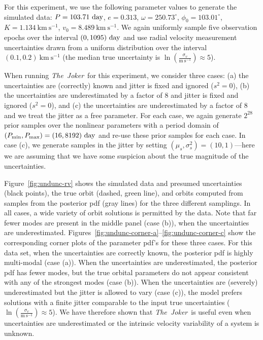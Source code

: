 \documentclass[manuscript, letterpaper]{aastex6}
\newcommand{\project}[1]{\textsl{#1}}
\newcommand{\samplername}{\project{The~Joker}}
\newcommand{\figname}{Figure}
\newcommand{\kms}{\mathrm{km}~\mathrm{s}^{-1}}
\newcommand{\mps}{\mathrm{m}~\mathrm{s}^{-1}}
\begin{document}
For this experiment, we use the following parameter values to generate the
simulated data: $P = 103.71~{\rm day}$, $e = 0.313$, $\omega = 250.73^\circ$,
$\phi_0 = 103.01^\circ$, $K = 1.134~\kms$, $v_0 = 8.489~\kms$.
We again uniformly sample five observation epochs over the interval $(0,1095)~{\rm
day}$ and use radial velocity measurement uncertainties drawn from a uniform
distribution over the interval $(0.1, 0.2)~\kms$ (the median true uncertainty is
$\ln \left(\frac{\sigma_v}{\mps}\right) \approx 5$).

When running \samplername\ for this experiment, we consider three cases:
(a) the uncertainties are (correctly) known and jitter is fixed and ignored ($s^2=0$), (b)
the uncertainties are underestimated by a factor of 8 and jitter is fixed and
ignored ($s^2=0$), and (c) the uncertainties are underestimated by a factor of 8
and we treat the jitter as a free parameter.
For each case, we again generate $2^{28}$ prior samples over the nonlinear
parameters with a period domain of $(P_{\rm min}, P_{\rm max}) = (16, 8192)~{\rm
day}$ and re-use these prior samples for each case.
In case (c), we generate samples in the jitter by setting
$(\mu_s,\sigma^2_s) = (10,1)$---here we are assuming that we have some suspicion
about the true magnitude of the uncertainties.

\figname~\ref{fig:undunc-rv} shows the simulated data and presumed uncertainties (black
points), the true orbit (dashed, green line), and orbits computed from samples
from the posterior pdf (gray lines) for the three different samplings.
In all cases, a wide variety of orbit solutions is permitted by the data.
Note that far fewer modes are present in the middle panel (case (b)), when the
uncertainties are underestimated.
\figname s~\ref{fig:undunc-corner-a}--\ref{fig:undunc-corner-c} show the
corresponding corner plots of the parameter pdf's for these three cases.
For this data set, when the uncertainties are correctly known, the posterior pdf
is highly multi-modal (case (a)).
When the uncertainties are underestimated, the posterior pdf has fewer modes,
but the true orbital parameters do not appear consistent with any of the
strongest modes (case (b)).
When the uncertainties are (severely) underestimated but the jitter is allowed
to vary (case (c)), the model prefers solutions with a finite jitter comparable
to the input true uncertainties ($\ln \left(\frac{\sigma_v}{\mps}\right) \approx
5$).
We have therefore shown that \samplername\ is useful even when uncertainties are
underestimated or the intrinsic velocity variability of a system is unknown.
\end{document}
